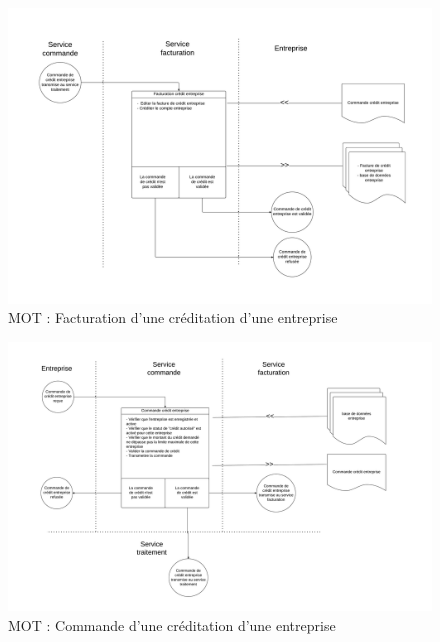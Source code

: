 \begin{landscape}
  \begin{figure}[H]
      \centering
      \includegraphics[height=\textwidth]{mot-facturation-credit-entreprise}
      \caption{MOT : Facturation d'une créditation d'une entreprise}
      \label{fig:mot-facturation-credit-entreprise}
  \end{figure}
\end{landscape}

\begin{landscape}
  \begin{figure}[H]
      \centering
      \includegraphics[height=\textwidth]{mot-commande-credit-entreprise}
      \caption{MOT : Commande d'une créditation d'une entreprise}
      \label{fig:mot-commande-credit-entreprise}
  \end{figure}
\end{landscape}

